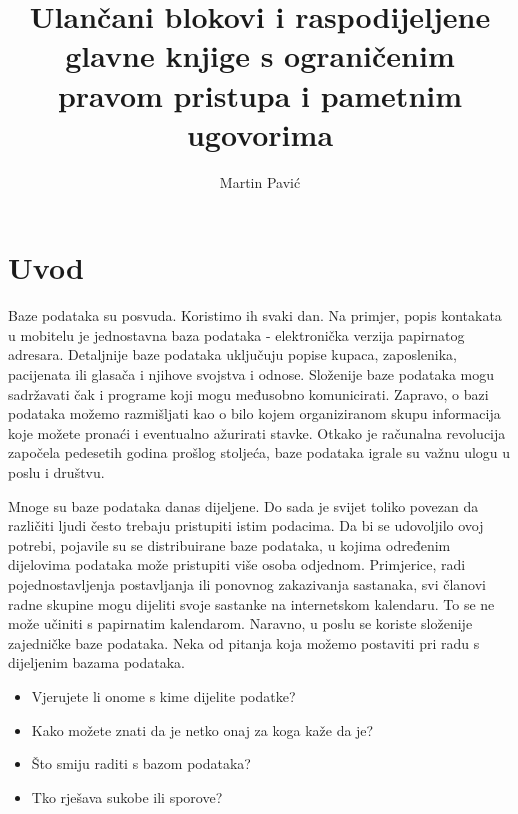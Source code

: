 \documentclass[times, utf8, diplomski]{fer}
\begin{document}

\title{Ulančani blokovi i raspodijeljene glavne knjige s ograničenim pravom pristupa i pametnim ugovorima}

\author{Martin Pavić}

\maketitle



\zahvala{}

\tableofcontents
\listoffigures
\listoftables

\chapter{Uvod}
Baze podataka su posvuda.  Koristimo ih svaki dan. Na primjer, popis kontakata u mobitelu je jednostavna baza podataka - elektronička verzija papirnatog adresara. Detaljnije baze podataka uključuju popise kupaca, zaposlenika, pacijenata ili glasača i njihove svojstva i odnose. Složenije baze podataka mogu sadržavati čak i programe koji mogu međusobno komunicirati. Zapravo, o bazi podataka možemo razmišljati kao o bilo kojem organiziranom skupu informacija koje možete pronaći i eventualno ažurirati stavke. Otkako je računalna revolucija započela pedesetih godina prošlog stoljeća, baze podataka igrale su važnu ulogu u poslu i društvu.

Mnoge su baze podataka danas dijeljene. Do sada je svijet toliko povezan da različiti ljudi često trebaju pristupiti istim podacima. Da bi se udovoljilo ovoj potrebi, pojavile su se distribuirane baze podataka, u kojima određenim dijelovima podataka može pristupiti više osoba odjednom. Primjerice, radi pojednostavljenja postavljanja ili ponovnog zakazivanja sastanaka, svi članovi radne skupine mogu dijeliti svoje sastanke na internetskom kalendaru. To se ne može učiniti s papirnatim kalendarom. Naravno, u poslu se koriste složenije zajedničke baze podataka. Neka od pitanja koja možemo postaviti pri radu s dijeljenim bazama podataka.

\begin{itemize}

\item Vjerujete li onome s kime dijelite podatke?

\item Kako možete znati da je netko onaj za koga kaže da je?

\item Što smiju raditi s bazom podataka?

\item Tko rješava sukobe ili sporove?

\end{itemize}
\end{document}
